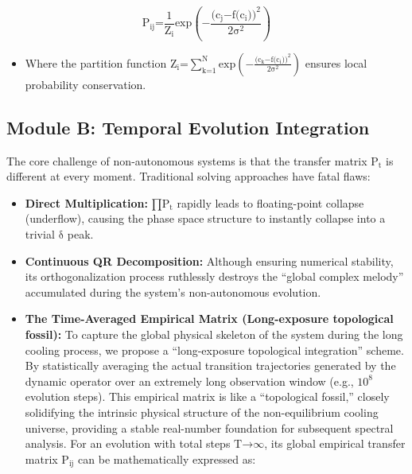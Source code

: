 \[\text{P}_{\text{ij}}\text{=}\frac{\text{1}}{\text{Z}_{\text{i}}}\text{exp}\left( \text{−}\frac{\text{(}\text{c}_{\text{j}}\text{−}\text{f}\text{(}\text{c}_{\text{i}}\text{)}\text{)}^{\text{2}}}{\text{2}\text{σ}^{\text{2}}} \right)\]

\begin{itemize}
\item
  Where the partition function
  \(\text{Z}_{\text{i}}\text{=}\sum_{\text{k}\text{=1}}^{\text{N}}\text{exp}\left( \text{−}\frac{\text{(}\text{c}_{\text{k}}\text{−}\text{f}\text{(}\text{c}_{\text{i}}\text{)}\text{)}^{\text{2}}}{\text{2}\text{σ}^{\text{2}}} \right)\)
  ensures local probability conservation.
\end{itemize}

\subsection*{Module B: Temporal Evolution Integration}

The core challenge of non-autonomous systems is that the transfer matrix
\(\text{P}_{\text{t}}\) is different at every moment. Traditional
solving approaches have fatal flaws:

\begin{itemize}
\item
  \textbf{Direct Multiplication:} \(\text{∏}\text{P}_{\text{t}}\)
  rapidly leads to floating-point collapse (underflow), causing the
  phase space structure to instantly collapse into a trivial
  \(\text{δ}\) peak.
\item
  \textbf{Continuous QR Decomposition:} Although ensuring numerical
  stability, its orthogonalization process ruthlessly destroys the
  ``global complex melody'' accumulated during the system's
  non-autonomous evolution.
\item
  \textbf{The Time-Averaged Empirical Matrix (Long-exposure topological
  fossil):} To capture the global physical skeleton of the system during
  the long cooling process, we propose a ``long-exposure topological
  integration'' scheme. By statistically averaging the actual transition
  trajectories generated by the dynamic operator over an extremely long
  observation window (e.g., \(\text{10}^{\text{8}}\) evolution steps).
  This empirical matrix is like a ``topological fossil,'' closely
  solidifying the intrinsic physical structure of the non-equilibrium
  cooling universe, providing a stable real-number foundation for
  subsequent spectral analysis. For an evolution with total steps
  \(\text{T}\text{→∞}\), its global empirical transfer matrix
  \(\text{P}_{\text{ij}}\) can be mathematically expressed as:
\end{itemize}

